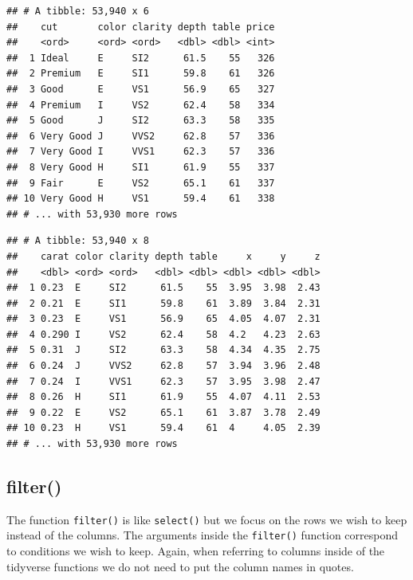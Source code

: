 \documentclass[
]{book}
\newenvironment{Shaded}{\begin{snugshade}}{\end{snugshade}}
\newcommand{\CommentTok}[1]{\textcolor[rgb]{0.56,0.35,0.01}{\textit{#1}}}
\newcommand{\KeywordTok}[1]{\textcolor[rgb]{0.13,0.29,0.53}{\textbf{#1}}}
\newcommand{\NormalTok}[1]{#1}
\newcommand{\OperatorTok}[1]{\textcolor[rgb]{0.81,0.36,0.00}{\textbf{#1}}}
\newcommand{\StringTok}[1]{\textcolor[rgb]{0.31,0.60,0.02}{#1}}
\begin{document}
\begin{verbatim}
## # A tibble: 53,940 x 6
##    cut       color clarity depth table price
##    <ord>     <ord> <ord>   <dbl> <dbl> <int>
##  1 Ideal     E     SI2      61.5    55   326
##  2 Premium   E     SI1      59.8    61   326
##  3 Good      E     VS1      56.9    65   327
##  4 Premium   I     VS2      62.4    58   334
##  5 Good      J     SI2      63.3    58   335
##  6 Very Good J     VVS2     62.8    57   336
##  7 Very Good I     VVS1     62.3    57   336
##  8 Very Good H     SI1      61.9    55   337
##  9 Fair      E     VS2      65.1    61   337
## 10 Very Good H     VS1      59.4    61   338
## # ... with 53,930 more rows
\end{verbatim}

\begin{Shaded}
\end{Shaded}

\begin{verbatim}
## # A tibble: 53,940 x 8
##    carat color clarity depth table     x     y     z
##    <dbl> <ord> <ord>   <dbl> <dbl> <dbl> <dbl> <dbl>
##  1 0.23  E     SI2      61.5    55  3.95  3.98  2.43
##  2 0.21  E     SI1      59.8    61  3.89  3.84  2.31
##  3 0.23  E     VS1      56.9    65  4.05  4.07  2.31
##  4 0.290 I     VS2      62.4    58  4.2   4.23  2.63
##  5 0.31  J     SI2      63.3    58  4.34  4.35  2.75
##  6 0.24  J     VVS2     62.8    57  3.94  3.96  2.48
##  7 0.24  I     VVS1     62.3    57  3.95  3.98  2.47
##  8 0.26  H     SI1      61.9    55  4.07  4.11  2.53
##  9 0.22  E     VS2      65.1    61  3.87  3.78  2.49
## 10 0.23  H     VS1      59.4    61  4     4.05  2.39
## # ... with 53,930 more rows
\end{verbatim}

\hypertarget{filter}{%
\subsection{filter()}\label{filter}}

The function \texttt{filter()} is like \texttt{select()} but we focus on the rows we wish to keep instead of the columns. The arguments inside the \texttt{filter()} function correspond to conditions we wish to keep. Again, when referring to columns inside of the tidyverse functions we do not need to put the column names in quotes.
\end{document}
